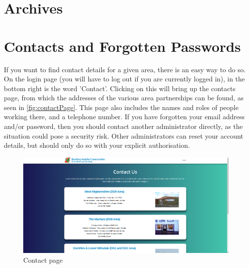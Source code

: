 \documentclass{bhcguides}
\begin{document}
\section{Archives}
\label{sec:archives}

\section{Contacts and Forgotten Passwords}
\label{sec:contacts}

If you want to find contact details for a given area, there is an easy way to do so. On the login page (you will have to log out if you are currently logged in), in the bottom right is the word 'Contact'. Clicking on this will bring up the contacts page, from which the addresses of the various area partnerships can be found, as seen in \autoref{fig:contactPage}. This page also includes the names and roles of people working there, and a telephone number. If you have forgotten your email address and/or password, then you should contact another administrator directly, as the situation could pose a security risk. Other administrators can reset your account details, but should only do so with your explicit authorisation.

\begin{figure}[h]
 \centerline{\includegraphics[width=\textwidth, height=\textheight, keepaspectratio]{contactpage.png}}
 \caption{Contact page}
 \label{fig:contactPage}
\end{figure}
\end{document}
